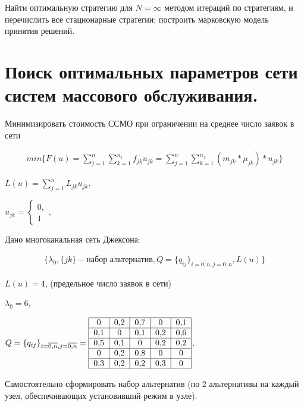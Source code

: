 \documentclass[a4paper, 12pt]{article}		%
\begin{document}
Найти оптимальную стратегию для $N=\infty$ методом итераций по стратегиям, и перечислить все стационарные стратегии; построить марковскую модель принятия решений.



\newpage
\section{Поиск оптимальных параметров сети систем массового обслуживания.}

Минимизировать стоимость ССМО при ограничении на среднее число заявок в сети

\begin{gather*}
min\{F(u) = \sum\limits_{j=1}^n \sum\limits_{k=1}^{n_j} f_{jk} u_{jk} = \sum\limits_{j=1}^n \sum\limits_{k=1}^{n_j} (m_{jk} * \mu_{jk}) * u_{jk} \}
\end{gather*} 

$ L(u) = \sum\limits_{j=1}^n L_{jk} u_{jk}$,

$ u_{jk} =
  \begin{cases}
    0,\\
    1
 \end{cases}$,
 
Дано многоканальная сеть Джексона:

\begin{gather*}
\{ \lambda_0, \{jk\} - \text{набор альтернатив}, Q=\{q_{ij}\}_{i=\overline{0,n}, j=\overline{0,n}}, L(u) \}
\end{gather*} 

$L(u) = 4$, (предельное число заявок в сети)

$\lambda_0 = 6$,

$Q=\{q_{ij}\}_{i=\overline{0,n}, j=\overline{0,n}} = \begin{tabular}{|c|c|c|c|c|}
\hline 
0 & 0,2 & 0,7 & 0 & 0,1 \\ 
\hline 
0,1 & 0 & 0,1 & 0,2 & 0,6 \\ 
\hline 
0,5 & 0,1 & 0 & 0,2 & 0,2 \\ 
\hline 
0 & 0,2 & 0,8 & 0 & 0 \\ 
\hline 
0,3 & 0,2 & 0,2 & 0,3 & 0 \\ 
\hline 
\end{tabular} $.

Самостоятельно сформировать набор альтернатив (по 2 альтернативы на каждый узел, обеспечивающих установивший режим в узле).
\end{document}
